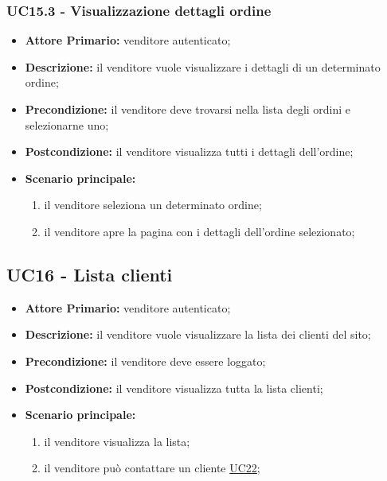 \subsubsection{UC15.3 - Visualizzazione dettagli ordine}
\label{UC15.3}
\begin{itemize}
    \item \textbf{Attore Primario:} venditore autenticato;
    \item \textbf{Descrizione:} il venditore vuole visualizzare i dettagli di un determinato ordine;
    \item \textbf{Precondizione:} il venditore deve trovarsi nella lista degli ordini e selezionarne uno;
    \item \textbf{Postcondizione:} il venditore visualizza tutti i dettagli dell'ordine;
    \item \textbf{Scenario principale:}
    \begin{enumerate}
        \item il venditore seleziona un determinato ordine;
        \item il venditore apre la pagina con i dettagli dell'ordine selezionato;
    \end{enumerate}
\end{itemize}

\subsection{UC16 - Lista clienti}
\label{UC16}
\begin{itemize}
    \item \textbf{Attore Primario:} venditore autenticato;
    \item \textbf{Descrizione:} il venditore vuole visualizzare la lista dei clienti del sito;
    \item \textbf{Precondizione:} il venditore deve essere loggato;
    \item \textbf{Postcondizione:} il venditore visualizza tutta la lista clienti;
    \item \textbf{Scenario principale:}
    \begin{enumerate}
        \item il venditore visualizza la lista;
         \item il venditore può contattare un cliente \hyperref[UC22]{UC22};
    \end{enumerate}
\end{itemize}


